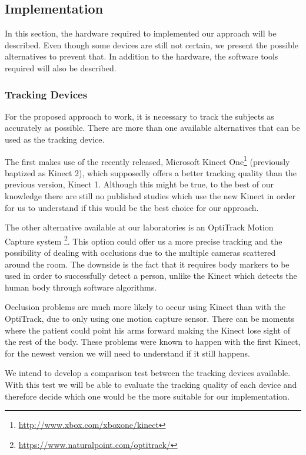 \documentclass[runningheads]{llncs}
\begin{document}
\subsection{Implementation}
\label{section-approach-HS}

In this section, the hardware required to implemented our approach will be described. Even though some devices are still not certain, we present the possible alternatives to prevent that. In addition to the hardware, the software tools required will also be described. 

\subsubsection{Tracking Devices}

For the proposed approach to work, it is necessary to track the subjects as accurately as possible. There are more than one available alternatives that can be used as the tracking device.

The first makes use of the recently released, Microsoft Kinect One\footnote{\url{http://www.xbox.com/xboxone/kinect}} 
(previously baptized as Kinect 2), which supposedly offers a better tracking quality than 
the previous version, Kinect 1. Although this might be true, to the best of our knowledge there are still no published studies which use the new Kinect in order for us to understand if this would be the best choice for our approach.

The other alternative available at our laboratories is an OptiTrack Motion Capture system \footnote{\url{https://www.naturalpoint.com/optitrack/}}. 
This option could offer us a more precise tracking and the possibility of dealing with occlusions due to the multiple cameras scattered around the room. The downside is the fact that 
it requires body markers to be used in order to successfully detect a person, unlike the 
Kinect which detects the human body through software algorithms.

Occlusion problems are much more likely to occur using Kinect than with the OptiTrack, due to only using one motion capture sensor. There can be moments where the patient could point his arms forward making the Kinect lose sight of the rest of the body. These problems were known to happen with the first Kinect, for the newest version we will need to understand if it still happens.

We intend to develop a comparison test between the tracking devices available. With this test we will be able to evaluate the tracking quality of each device and therefore decide which one would be the more suitable for our implementation. 
\end{document}
